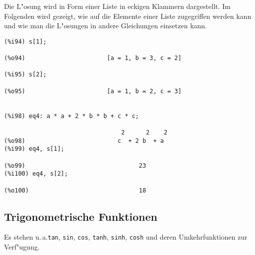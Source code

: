 \documentclass[ngerman,12pt,a4paper]{article}
\begin{document}
Die L"osung wird in Form einer Liste in eckigen Klammern dargestellt. Im Folgenden wird gezeigt, wie auf die Elemente einer Liste zugegriffen werden kann und wie man die L"osungen in andere Gleichungen einsetzen kann.

\scriptsize
\begin{verbatim}
(%i94) s[1];

(%o94)                       [a = 1, b = 3, c = 2]

(%i95) s[2];

(%o95)                       [a = 1, b = 2, c = 3]


(%i98) eq4: a * a + 2 * b * b + c * c;

                                 2      2    2
(%o98)                          c  + 2 b  + a
(%i99) eq4, s[1];

(%o99)                                23
(%i100) eq4, s[2];

(%o100)                               18
\end{verbatim}
\normalsize

\subsection{Trigonometrische Funktionen}

Es stehen u.\,a.\@ \verb|tan|, \verb|sin|, \verb|cos|, \verb|tanh|, \verb|sinh|, \verb|cosh| und deren Umkehrfunktionen zur Verf"ugung.
\end{document}
